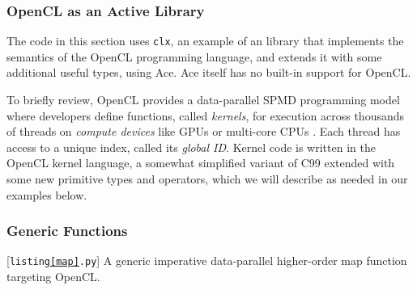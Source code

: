 \subsubsection{OpenCL as an Active Library}
The code in this section uses \verb|clx|, an example of an library that implements the semantics of the OpenCL programming language, and extends it with some additional useful types, using Ace. Ace itself has no built-in support for OpenCL.

To briefly review, OpenCL provides a data-parallel SPMD programming model where developers define functions, called {\em kernels}, for execution across thousands of threads on \emph{compute devices} like GPUs or multi-core CPUs \cite{opencl11}. Each thread has access to a unique index, called its \emph{global ID}. Kernel code is written in the OpenCL kernel language, a somewhat simplified variant of C99 extended with some new primitive types and operators, which we will describe as needed in our examples below.

\subsubsection{Generic Functions}\label{genfn}
\begin{codelisting}

\caption{[\texttt{listing\ref{map}.py}] A generic imperative data-parallel higher-order map function targeting OpenCL.}
\label{map}
\end{codelisting}
%
%

